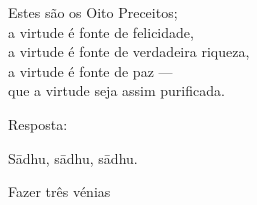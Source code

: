 \clearpage

\begin{english}
  Estes são os Oito Preceitos;\\
  a virtude é fonte de felicidade,\\
  a virtude é fonte de verdadeira riqueza,\\
  a virtude é fonte de paz ---\\
  que a virtude seja assim purificada.
\end{english}

\begin{instruction}
  Resposta:
\end{instruction}

Sādhu, sādhu, sādhu.

\begin{instruction}
  Fazer três vénias
\end{instruction}

